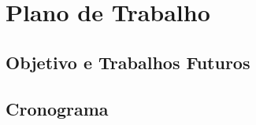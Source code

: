 \chapter{Plano de Trabalho}
\label{chap:plano}

\section{Objetivo e Trabalhos Futuros}
\label{sec:objt}

\section{Cronograma}
\label{sec:sched}
